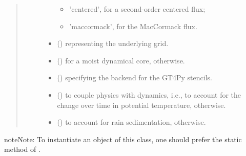 \documentclass[letterpaper,10pt,english]{sphinxmanual}
\begin{document}
\begin{fulllineitems}
\begin{fulllineitems}
\begin{quote}
\begin{description}
\begin{itemize}
\begin{itemize}
\item {} 
’centered’, for a second-order centered flux;

\item {} 
’maccormack’, for the MacCormack flux.

\end{itemize}


\item {} 
 () \textendash{} {\hyperref[\detokenize{api:grids.grid_xyz.GridXYZ}]{}} representing the underlying grid.

\item {} 
 () \textendash{}  for a moist dynamical core,  otherwise.

\item {} 
 () \textendash{}  specifying the backend for the GT4Py stencils.

\item {} 
 () \textendash{}  to couple physics with dynamics, i.e., to account for the change over time in potential
temperature,  otherwise.

\item {} 
 () \textendash{}  to account for rain sedimentation,  otherwise.

\end{itemize}

\end{description}\end{quote}

\begin{sphinxadmonition}{note}{Note:}
To instantiate an object of this class, one should prefer the static method
{\hyperref[\detokenize{api:dycore.prognostic_isentropic_nonconservative.PrognosticIsentropicNonconservative.factory}]{}} of
{\hyperref[\detokenize{api:dycore.prognostic_isentropic_nonconservative.PrognosticIsentropicNonconservative}]{}}.
\end{sphinxadmonition}


\end{fulllineitems}
\end{fulllineitems}
\end{document}
